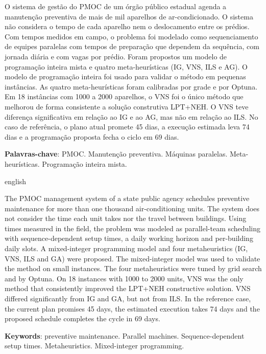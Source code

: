 \begin{resumo}

    O sistema de gestão do PMOC de um órgão público estadual agenda a manutenção preventiva de mais de mil aparelhos de ar-condicionado. O sistema não considera o tempo de cada aparelho nem o deslocamento entre os prédios. Com tempos medidos em campo, o problema foi modelado como sequenciamento de equipes paralelas com tempos de preparação que dependem da sequência, com jornada diária e com vagas por prédio. Foram propostos um modelo de programação inteira mista e quatro meta-heurísticas (IG, VNS, ILS e AG). O modelo de programação inteira foi usado para validar o método em pequenas instâncias. As quatro meta-heurísticas foram calibradas por grade e por Optuna. Em 18 instâncias com 1000 a 2000 aparelhos, o VNS foi o único método que melhorou de forma consistente a solução construtiva LPT+NEH. O VNS teve diferença significativa em relação ao IG e ao AG, mas não em relação ao ILS. No caso de referência, o plano atual promete 45 dias, a execução estimada leva 74 dias e a programação proposta fecha o ciclo em 69 dias.

    \noindent\textbf{Palavras-chave}: PMOC. Manutenção preventiva. Máquinas paralelas. Meta-heurísticas. Programação inteira mista.

\end{resumo}

\begin{resumo}[Abstract]
\begin{otherlanguage*}{english}

    The PMOC management system of a state public agency schedules preventive maintenance for more than one thousand air-conditioning units. The system does not consider the time each unit takes nor the travel between buildings. Using times measured in the field, the problem was modeled as parallel-team scheduling with sequence-dependent setup times, a daily working horizon and per-building daily slots. A mixed-integer programming model and four metaheuristics (IG, VNS, ILS and GA) were proposed. The mixed-integer model was used to validate the method on small instances. The four metaheuristics were tuned by grid search and by Optuna. On 18 instances with 1000 to 2000 units, VNS was the only method that consistently improved the LPT+NEH constructive solution. VNS differed significantly from IG and GA, but not from ILS. In the reference case, the current plan promises 45 days, the estimated execution takes 74 days and the proposed schedule completes the cycle in 69 days.


    \noindent\textbf{Keywords}: preventive maintenance. Parallel machines. Sequence-dependent setup times. Metaheuristics. Mixed-integer programming.
\end{otherlanguage*}
\end{resumo}
